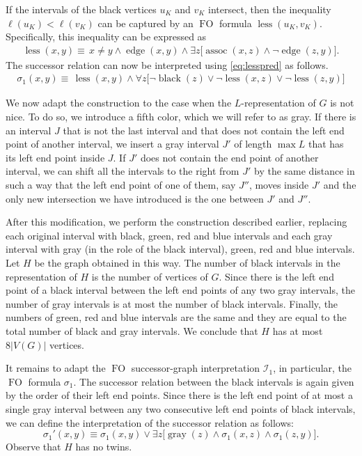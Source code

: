 \documentclass{CSML}
\def\prebox#1{\mathop{\mbox{#1}}}
\newcommand{\FO}{\ensuremath{\operatorname{FO}}\xspace}
\newcommand{\cI}{\mathcal{I}}
\theoremstyle{plain}\newtheorem{claim}[thm]{Claim}
\begin{document}
If the intervals of the black vertices $u_K$ and $v_K$ intersect,
then the inequality $\ell(u_K)<\ell(v_K)$ can be captured by an \FO formula $\prebox{less}(u_K,v_K)$.
Specifically, this inequality can be expressed as
\begin{align}\label{eq:lesspred}
\prebox{less}(x,y)\equiv\, x\not=y\wedge\prebox{edge}(x,y)\wedge
	\exists z\big[\prebox{assoc}(x,z)\wedge\neg \prebox{edge}(z,y)\big]
.\end{align}
The successor relation can now be interpreted using \eqref{eq:lesspred} as follows.
\begin{align}\label{eq:succ1}
\sigma_1(x,y)\equiv\, \prebox{less}(x,y) \wedge
	\forall z\big[\neg\prebox{black}(z)\vee 
		\neg\prebox{less}(x,z)\vee\neg\prebox{less}(z,y)\big]
\end{align}

We now adapt the construction to the case when the $L$-representation of $G$ is not nice.
To do so, we introduce a fifth color, which we will refer to as gray.
If there is an interval $J$ that is not the last interval and that does not contain the left end point of another interval,
we insert a gray interval $J'$ of length $\max L$ that has its left end point inside $J$.
If $J'$ does not contain the end point of another interval,
we can shift all the intervals to the right from $J'$ by the same distance in such a way that
the left end point of one of them, say $J''$, moves inside $J'$ and
the only new intersection we have introduced is the one between $J'$ and $J''$.

After this modification, we perform the construction described earlier,
replacing each original interval with black, green, red and blue intervals and
each gray interval with gray (in the role of the black interval), green, red and blue intervals.
Let $H$ be the graph obtained in this way.
The number of black intervals in the representation of $H$ is the number of vertices of $G$.
Since there is the left end point of a black interval between the left end points of any two gray intervals,
the number of gray intervals is at most the number of black intervals.
Finally, the numbers of green, red and blue intervals are the same and
they are equal to the total number of black and gray intervals.
We conclude that $H$ has at most $8|V(G)|$ vertices.

It remains to adapt the \FO successor-graph interpretation $\cI_1$,
in particular, the \FO formula $\sigma_1$.
The successor relation between the black intervals is again given by the order of their left end points.
Since there is the left end point of at most a single gray interval between any two consecutive left end points of black intervals,
we can define the interpretation of the successor relation as follows:
$$\sigma_1'(x,y)\equiv\sigma_1(x,y)\vee \exists z\big[
 \prebox{gray}(z)\wedge\sigma_1(x,z)\wedge\sigma_1(z,y)\big]
.$$
Observe that $H$ has no twins.
\end{document}
